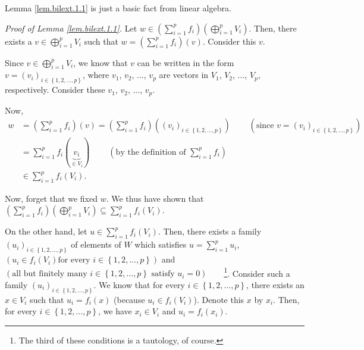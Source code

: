 \documentclass[etingof-lie.tex]{subfiles}
\begin{document}
\begin{noncompile}
\begin{lemma}
\end{lemma}

Lemma \ref{lem.bilext.1.1} is just a basic fact from linear algebra.

\begin{verlong}
\textit{Proof of Lemma \ref{lem.bilext.1.1}.} Let $w\in\left(  \sum
\limits_{i=1}^{p}f_{i}\right)  \left(  \bigoplus\limits_{i=1}^{p}V_{i}\right)
$. Then, there exists a $v\in\bigoplus\limits_{i=1}^{p}V_{i}$ such that
$w=\left(  \sum\limits_{i=1}^{p}f_{i}\right)  \left(  v\right)  $. Consider
this $v$.

Since $v\in\bigoplus\limits_{i=1}^{p}V_{i}$, we know that $v$ can be written
in the form $v=\left(  v_{i}\right)  _{i\in\left\{  1,2,...,p\right\}  }$,
where $v_{1}$, $v_{2}$, $...$, $v_{p}$ are vectors in $V_{1}$, $V_{2}$, $...$,
$V_{p}$, respectively. Consider these $v_{1}$, $v_{2}$, $...$, $v_{p}$.

Now,%
\begin{align*}
w  &  =\left(  \sum\limits_{i=1}^{p}f_{i}\right)  \left(  v\right)  =\left(
\sum\limits_{i=1}^{p}f_{i}\right)  \left(  \left(  v_{i}\right)
_{i\in\left\{  1,2,...,p\right\}  }\right)  \ \ \ \ \ \ \ \ \ \ \left(
\text{since }v=\left(  v_{i}\right)  _{i\in\left\{  1,2,...,p\right\}
}\right) \\
&  =\sum\limits_{i=1}^{p}f_{i}\left(  \underbrace{v_{i}}_{\in V_{i}}\right)
\ \ \ \ \ \ \ \ \ \ \left(  \text{by the definition of }\sum\limits_{i=1}%
^{p}f_{i}\right) \\
&  \in\sum\limits_{i=1}^{p}f_{i}\left(  V_{i}\right)  .
\end{align*}


Now, forget that we fixed $w$. We thus have shown that $\left(  \sum
\limits_{i=1}^{p}f_{i}\right)  \left(  \bigoplus\limits_{i=1}^{p}V_{i}\right)
\subseteq\sum\limits_{i=1}^{p}f_{i}\left(  V_{i}\right)  $.

On the other hand, let $u\in\sum\limits_{i=1}^{p}f_{i}\left(  V_{i}\right)  $.
Then, there exists a family $\left(  u_{i}\right)  _{i\in\left\{
1,2,...,p\right\}  }$ of elements of $W$ which satisfies $u=\sum
\limits_{i=1}^{p}u_{i}$, $\left(  u_{i}\in f_{i}\left(  V_{i}\right)  \text{
for every }i\in\left\{  1,2,...,p\right\}  \right)  $ and $\left(  \text{all
but finitely many }i\in\left\{  1,2,...,p\right\}  \text{ satisfy }%
u_{i}=0\right)  $\ \ \ \ \footnote{The third of these conditions is a
tautology, of course.}. Consider such a family $\left(  u_{i}\right)
_{i\in\left\{  1,2,...,p\right\}  }$. We know that for every $i\in\left\{
1,2,...,p\right\}  $, there exists an $x\in V_{i}$ such that $u_{i}%
=f_{i}\left(  x\right)  $ (because $u_{i}\in f_{i}\left(  V_{i}\right)  $).
Denote this $x$ by $x_{i}$. Then, for every $i\in\left\{  1,2,...,p\right\}
$, we have $x_{i}\in V_{i}$ and $u_{i}=f_{i}\left(  x_{i}\right)  $.


\end{verlong}
\end{noncompile}
\end{document}
